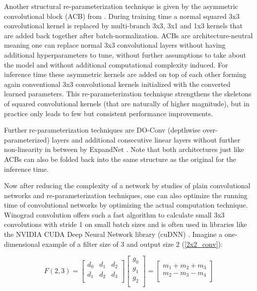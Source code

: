 Another structural re-parameterization technique is given by the asymmetric convolutional block (ACB) from \cite{XiaohanDing.2019}. During training time a normal squared 3x3 convolutional kernel is replaced by multi-branch 3x3, 3x1 and 1x3 kernels that are added back together after batch-normalization. ACBs are architecture-neutral meaning one can replace normal 3x3 convolutional layers without having additional hyperparameters to tune, without further assumptions to take about the model and without additional computational complexity induced. For inference time these asymmetric kernels are added on top of each other forming again conventional 3x3 convolutional kernels initialized with the converted learned parameters. This re-parameterization technique strengthens the skeletons of squared convolutional kernels (that are naturally of higher magnitude), but in practice only leads to few but consistent performance improvements. \cite{XiaohanDing.2019}

Further re-parameterization techniques are DO-Conv (depthwise over-parameterized) layers \cite{JinmingCao.2020} and additional consecutive linear layers without further non-linearity in between by ExpandNet \cite{ShuxuanGuo.2021}. Note that both architectures just like ACBs can also be folded back into the same structure as the original for the inference time. 

Now after reducing the complexity of a network by studies of plain convolutional networks and re-parameterization techniques, one can also optimize the running time of convolutional networks by optimizing the actual computation technique. Winograd convolution offers such a fast algorithm to calculate small 3x3 convolutions with stride 1 on small batch sizes and is often used in libraries like the NVIDIA CUDA Deep Neural Network library (cuDNN) \cite{SharanChetlur.2014}. Imagine a one-dimensional example of a filter size of 3 and output size 2 (\autoref{2x2_conv}):

\begin{equation} \label{2x2_conv}
	F(2,3) = \begin{bmatrix}
		d_0 & d_1 & d_2 \\
		d_1 & d_2 & d_3 \\
	\end{bmatrix} \begin{bmatrix}
		g_0 \\
		g_1 \\
		g_2 \\
	\end{bmatrix} = \begin{bmatrix}
		m_1 + m_2 + m_3 \\
		m_2 - m_3 - m_4 \\
	\end{bmatrix}
\end{equation}

